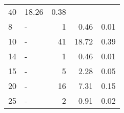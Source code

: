 \begin{longtable}{lXrrr}
       \num{40} &
       \num[round-mode=places,round-precision=2]{18.26} &
         \num[round-mode=places,round-precision=2]{0.38} \\

     8 &
     \multicolumn{1}{X}{ -  } &


       \num{1} &
       \num[round-mode=places,round-precision=2]{0.46} &
         \num[round-mode=places,round-precision=2]{0.01} \\

     10 &
     \multicolumn{1}{X}{ -  } &


       \num{41} &
       \num[round-mode=places,round-precision=2]{18.72} &
         \num[round-mode=places,round-precision=2]{0.39} \\

     14 &
     \multicolumn{1}{X}{ -  } &


       \num{1} &
       \num[round-mode=places,round-precision=2]{0.46} &
         \num[round-mode=places,round-precision=2]{0.01} \\

     15 &
     \multicolumn{1}{X}{ -  } &


       \num{5} &
       \num[round-mode=places,round-precision=2]{2.28} &
         \num[round-mode=places,round-precision=2]{0.05} \\

     20 &
     \multicolumn{1}{X}{ -  } &


       \num{16} &
       \num[round-mode=places,round-precision=2]{7.31} &
         \num[round-mode=places,round-precision=2]{0.15} \\

     25 &
     \multicolumn{1}{X}{ -  } &


       \num{2} &
       \num[round-mode=places,round-precision=2]{0.91} &
         \num[round-mode=places,round-precision=2]{0.02} \\


\end{longtable}
